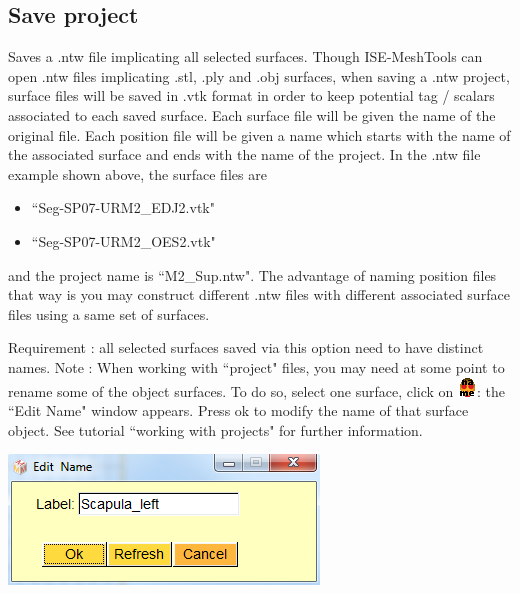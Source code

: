 \subsection{Save project}
Saves a .ntw file implicating all selected surfaces. Though ISE-MeshTools can open .ntw files
implicating .stl, .ply and .obj surfaces, when saving a .ntw project, surface files will be saved in .vtk format in order to keep potential tag / scalars associated to each saved surface. Each surface file will be given the name of the original file. Each position file will be given a name which starts with the name of the associated surface and ends with the name of the project. In the .ntw file example shown above, the surface files are 
\begin{itemize}
\item ``Seg-SP07-URM2\_EDJ2.vtk" 
\item ``Seg-SP07-URM2\_OES2.vtk"
\end{itemize}
\noindent and the project name is ``M2\_Sup.ntw". The advantage of naming position files that way is you may construct different .ntw files with different associated surface files using a same set of surfaces.\\
\noindent
\begin{minipage}{0.6\textwidth}
\noindent \noindent Requirement : all selected surfaces saved via this option
need to have distinct names.
Note : When working with ``project" files, you may need at
some point to rename some of the object surfaces. To do so,
select one surface, click on \includegraphics[scale=0.7]{images/pixmap/name.png}: the ``Edit Name" window appears.
Press ok to modify the name of that surface object.
See tutorial ``working with projects" for further information.
\end{minipage}  
 \begin{minipage}{0.4\textwidth}\centering
  \includegraphics[scale=0.5]{images/Icons/edit_name.png}
 \end{minipage} 


